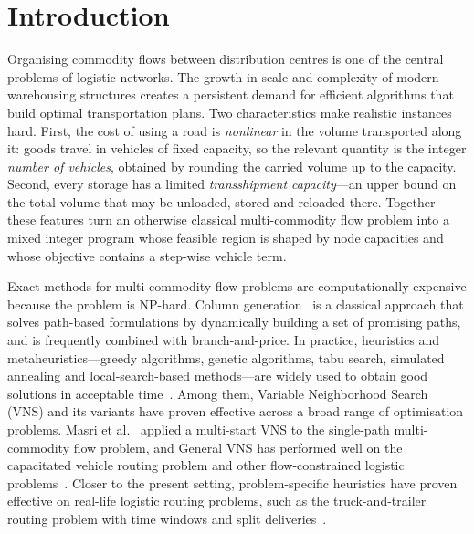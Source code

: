 \documentclass[runningheads]{llncs}
\begin{document}
\section{Introduction}

Organising commodity flows between distribution centres is one of the central
problems of logistic networks. The growth in scale and complexity of modern
warehousing structures creates a persistent demand for efficient algorithms
that build optimal transportation plans. Two characteristics make realistic
instances hard. First, the cost of using a road is \emph{nonlinear} in the
volume transported along it: goods travel in vehicles of fixed capacity, so
the relevant quantity is the integer \emph{number of vehicles}, obtained by
rounding the carried volume up to the capacity. Second, every storage has a
limited \emph{transshipment capacity}---an upper bound on the total volume
that may be unloaded, stored and reloaded there. Together these features turn
an otherwise classical multi-commodity flow problem into a mixed integer
program whose feasible region is shaped by node capacities and whose
objective contains a step-wise vehicle term.

Exact methods for multi-commodity flow problems are computationally expensive
because the problem is NP-hard. Column generation~\cite{barnhart1998} is a
classical approach that solves path-based formulations by dynamically building
a set of promising paths, and is frequently combined with branch-and-price. In
practice, heuristics and metaheuristics---greedy algorithms, genetic
algorithms, tabu search, simulated annealing and local-search-based
methods---are widely used to obtain good solutions in acceptable
time~\cite{crainic2015}. Among them, Variable Neighborhood Search (VNS) and
its variants have proven effective across a broad range of optimisation
problems. Masri et al.~\cite{masri2015} applied a multi-start VNS to the
single-path multi-commodity flow problem, and General VNS has performed well
on the capacitated vehicle routing problem and other flow-constrained logistic
problems~\cite{amous2017}. Closer to the present setting, problem-specific
heuristics have proven effective on real-life logistic routing problems, such as
the truck-and-trailer routing problem with time windows and split
deliveries~\cite{batsyn2014ttrp,batsyn2015heuristic}.
\end{document}
